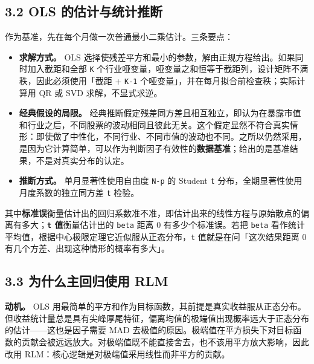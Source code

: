 \documentclass[UTF8,a4paper,11pt]{ctexart}
\begin{document}
{}
\subsection*{3.2 OLS 的估计与统计推断}

作为基准，先在每个月做一次普通最小二乘估计。三条要点：

\begin{itemize}[leftmargin=2em,itemsep=2pt,topsep=3pt]
\item 
\textbf{求解方式。} OLS 选择使残差平方和最小的参数，解由正规方程给出。如果同时加入截距和全部 \texttt{K} 个行业哑变量，哑变量之和恒等于截距列，设计矩阵不满秩，因此必须使用「截距 + \texttt{K-1} 个哑变量」，并在每月拟合前检查秩；实际计算用 QR 或 SVD 求解，不显式求逆。

\item 
\textbf{经典假设的局限。} 经典推断假定残差同方差且相互独立，即认为在暴露市值和行业之后，不同股票的波动相同且彼此无关。这个假定显然不符合真实情形：即使做了中性化，不同行业、不同市值的波动也不同。之所以仍然采用，是因为它计算简单，可以作为判断因子有效性的\textbf{数据基准}；给出的是基准结果，不是对真实分布的认定。

\item 
\textbf{推断方式。} 单月显著性使用自由度 \texttt{N-p} 的 Student \texttt{t} 分布，全期显著性使用月度系数的独立同方差 \texttt{t} 检验。

\end{itemize}

其中\textbf{标准误}衡量估计出的回归系数准不准，即估计出来的线性方程与原始散点的偏离有多大；\textbf{\texttt{t} 值}衡量估计出的 \texttt{beta} 距离 0 有多少个标准误。若把 \texttt{beta} 看作统计平均值，根据中心极限定理它近似服从正态分布，\texttt{t} 值就是在问「这次结果距离 0 有几个方差、出现这种情形的概率有多大」。

{}
\subsection*{3.3 为什么主回归使用 RLM}

\textbf{动机。} OLS 用最简单的平方和作为目标函数，其前提是真实收益服从正态分布。但收益统计量总是具有尖峰厚尾特征，偏离均值的极端值出现概率远大于正态分布的估计——这也是因子需要 MAD 去极值的原因。极端值在平方损失下对目标函数的贡献会被远远放大。对极端值既不能直接舍去，也不该用平方放大影响，因此改用 RLM：核心逻辑是对极端值采用线性而非平方的贡献。
\end{document}
